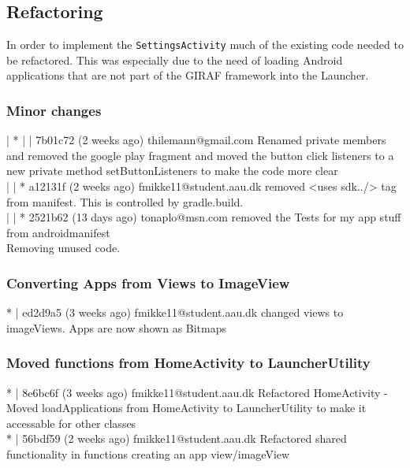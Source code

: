 \subsection{Refactoring}\label{sect:sprint3:refactoring}
In order to implement the \lstinline!SettingsActivity! much of the existing code needed to be refactored.
This was especially due to the need of loading Android applications that are not part of the GIRAF framework  into the Launcher. 

\subsubsection{Minor changes}
| * | | 7b01c72 (2 weeks ago) thilemann@gmail.com Renamed private members and removed the google play fragment and moved the button click listeners to a new private method setButtonListeners to make the code
 more clear\\
 
| | * a12131f (2 weeks ago) fmikke11@student.aau.dk removed <uses sdk../> tag from manifest. This is controlled by gradle.build.\\
| | * 2521b62 (13 days ago) tonaplo@msn.com removed the Tests for my app stuff from androidmanifest\\
 
 Removing unused code.\\
 
\subsubsection{Converting Apps from Views to ImageView}
* | ed2d9a5 (3 weeks ago) fmikke11@student.aau.dk changed views to imageViews. Apps are now shown as Bitmaps\\

\subsubsection{Moved functions from HomeActivity to LauncherUtility}
* | 8e6bc6f (3 weeks ago) fmikke11@student.aau.dk Refactored HomeActivity - Moved loadApplications from HomeActivity to LauncherUtility to make it accessable for other classes\\
* | 56bdf59 (2 weeks ago) fmikke11@student.aau.dk Refactored shared functionality in functions creating an app view/imageView\\

